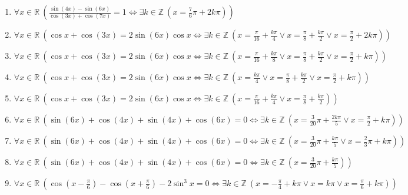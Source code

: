 \documentclass[11pt,a4paper]{article}
\begin{document}
\begin{enumerate}
\item $\displaystyle \forall x \in \mathbb{R}\ \left( \frac{\sin\left(4x\right) - \sin\left(6x\right)}{\cos\left(3x\right) + \cos\left(7x\right)} = 1 \iff \exists k \in \mathbb{Z}\ \left( x = \frac{7}{6}\pi + 2k\pi \right) \right)$
\item $\displaystyle \forall x \in \mathbb{R}\ \left( \cos x + \cos\left(3x\right) = 2\sin\left(6x\right)\cos x \iff \exists k \in \mathbb{Z}\ \left( x = \frac{\pi}{16} + \frac{k\pi}{4} \lor x = \frac{\pi}{8} + \frac{k\pi}{2} \lor x = \frac{\pi}{2} + 2k\pi \right) \right)$
\item $\displaystyle \forall x \in \mathbb{R}\ \left( \cos x + \cos\left(3x\right) = 2\sin\left(6x\right)\cos x \iff \exists k \in \mathbb{Z}\ \left( x = \frac{\pi}{16} + \frac{k\pi}{8} \lor x = \frac{\pi}{8} + \frac{k\pi}{2} \lor x = \frac{\pi}{2} + k\pi \right) \right)$
\item $\displaystyle \forall x \in \mathbb{R}\ \left( \cos x + \cos\left(3x\right) = 2\sin\left(6x\right)\cos x \iff \exists k \in \mathbb{Z}\ \left( x = \frac{k\pi}{4} \lor x = \frac{\pi}{8} + \frac{k\pi}{2} \lor x = \frac{\pi}{2} + k\pi \right) \right)$
\item $\displaystyle \forall x \in \mathbb{R}\ \left( \cos x + \cos\left(3x\right) = 2\sin\left(6x\right)\cos x \iff \exists k \in \mathbb{Z}\ \left( x = \frac{\pi}{16} + \frac{k\pi}{4} \lor x = \frac{\pi}{8} + \frac{k\pi}{2} \right) \right)$
\item $\displaystyle \forall x \in \mathbb{R}\ \left( \sin\left(6x\right) + \cos\left(4x\right) + \sin\left(4x\right) + \cos\left(6x\right) = 0 \iff \exists k \in \mathbb{Z}\ \left( x = \frac{3}{20}\pi + \frac{2k\pi}{5} \lor x = \frac{\pi}{2} + k\pi \right) \right)$
\item $\displaystyle \forall x \in \mathbb{R}\ \left( \sin\left(6x\right) + \cos\left(4x\right) + \sin\left(4x\right) + \cos\left(6x\right) = 0 \iff \exists k \in \mathbb{Z}\ \left( x = \frac{3}{20}\pi + \frac{k\pi}{5} \lor x = \frac{2}{3}\pi + k\pi \right) \right)$
\item $\displaystyle \forall x \in \mathbb{R}\ \left( \sin\left(6x\right) + \cos\left(4x\right) + \sin\left(4x\right) + \cos\left(6x\right) = 0 \iff \exists k \in \mathbb{Z}\ \left( x = \frac{3}{20}\pi + \frac{k\pi}{5} \right) \right)$
\item $\displaystyle \forall x \in \mathbb{R}\ \left( \cos\left(x - \frac{\pi}{6}\right) - \cos\left(x + \frac{\pi}{6}\right) - 2\sin^{3} x = 0 \iff \exists k \in \mathbb{Z}\ \left( x = -\frac{\pi}{4} + k\pi \lor x = k\pi \lor x = \frac{\pi}{6} + k\pi \right) \right)$

\end{enumerate}
\end{document}
